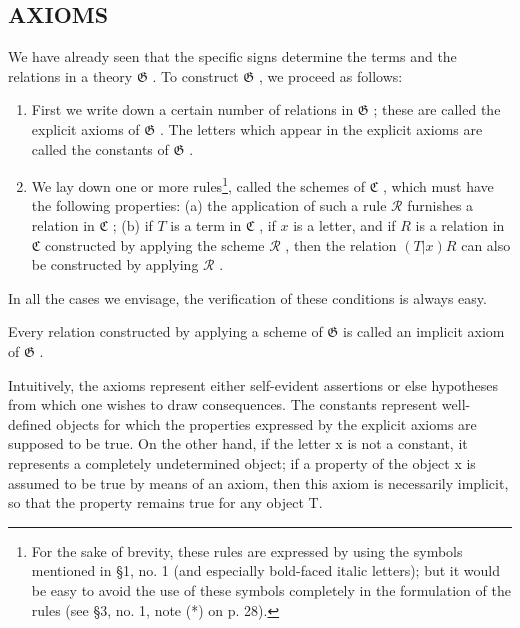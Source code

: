 \subsection{AXIOMS}

We have already seen that the specific signs determine the terms and the relations in a theory \(\mathfrak{G}\) . To construct \(\mathfrak{G}\) , we proceed as follows:

\begin{enumerate}
\def\labelenumi{(\arabic{enumi})}
\item
  First we write down a certain number of relations in \(\mathfrak{G}\) ; these are called the explicit axioms of \(\mathfrak{G}\) . The letters which appear in the explicit axioms are called the constants of \(\mathfrak{G}\) .
\item
  We lay down one or more rules\footnote{For the sake of brevity, these rules are expressed by using the symbols mentioned in §1, no. 1 (and especially bold-faced italic letters); but it would be easy to avoid the use of these symbols completely in the formulation of the rules (see §3, no. 1, note (*) on p. 28).}, called the schemes of \(\mathfrak{C}\) , which must have the following properties: (a) the application of such a rule \(\mathcal{R}\) furnishes a relation in \(\mathfrak{C}\) ; (b) if \(T\) is a term in \(\mathfrak{C}\) , if \(x\) is a letter, and if \(R\) is a relation in \(\mathfrak{C}\) constructed by applying the scheme \(\mathcal{R}\) , then the relation \((T|x)R\) can also be constructed by applying \(\mathcal{R}\) .
\end{enumerate}

In all the cases we envisage, the verification of these conditions is always easy.

Every relation constructed by applying a scheme of \(\mathfrak{G}\) is called an implicit axiom of \(\mathfrak{G}\) .

Intuitively, the axioms represent either self-evident assertions or else hypotheses from which one wishes to draw consequences. The constants represent well-defined objects for which the properties expressed by the explicit axioms are supposed to be true. On the other hand, if the letter x is not a constant, it represents a completely undetermined object; if a property of the object x is assumed to be true by means of an axiom, then this axiom is necessarily implicit, so that the property remains true for any object T.

